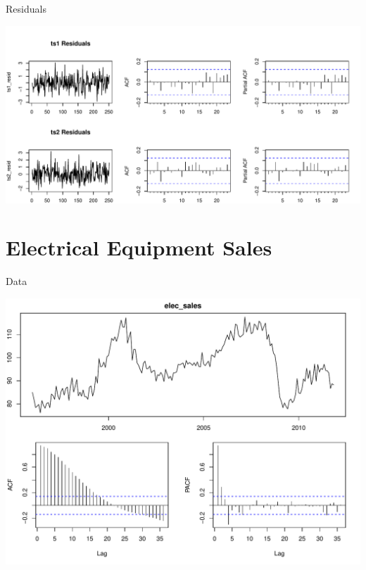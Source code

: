 \documentclass[11pt,ignorenonframetext,]{beamer}
\begin{document}
\begin{frame}{Residuals}

\includegraphics{Lec9_files/figure-beamer/unnamed-chunk-12-1.pdf}

\end{frame}

\section{Electrical Equipment Sales}\label{electrical-equipment-sales}

\begin{frame}{Data}

\includegraphics{Lec9_files/figure-beamer/unnamed-chunk-13-1.pdf}

\end{frame}
\end{document}
